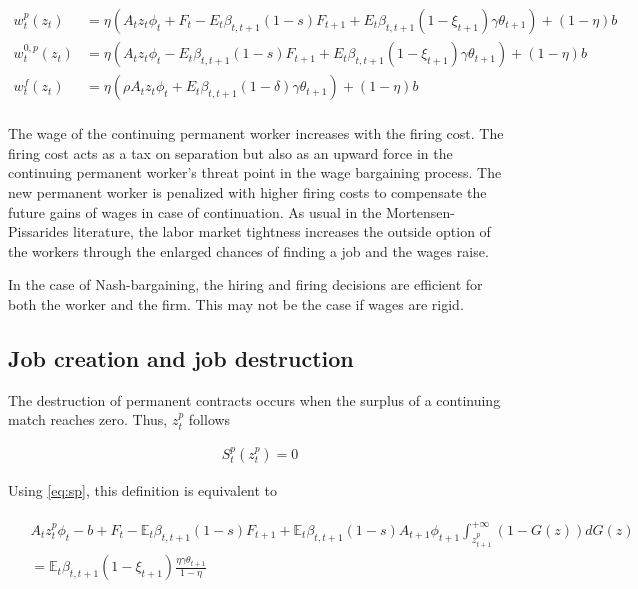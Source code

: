 \begin{align*}
w_t^p \left( z_t \right) &= \eta \left( A_t z_t \phi_t + F_t - E_t \beta_{t,t+1} (1-s) F_{t+1} + E_t \beta_{t,t+1} \left( 1-\xi_{t+1} \right) \gamma \theta_{t+1} \right) + (1-\eta) b\\
w_t^{0,p} \left( z_t \right) &= \eta \left( A_t z_t \phi_t - E_t \beta_{t,t+1} (1-s) F_{t+1} + E_t \beta_{t,t+1} \left( 1-\xi_{t+1} \right) \gamma \theta_{t+1} \right) + (1-\eta) b\\
w_t^f \left( z_t \right) &= \eta \left( \rho A_t z_t \phi_t + E_t \beta_{t,t+1} \left( 1-\delta \right) \gamma \theta_{t+1} \right) + (1-\eta) b\\
\end{align*}

The wage of the continuing permanent worker increases with the firing cost. The firing cost acts as a tax on separation but also as an upward force in the continuing permanent worker's threat point in the wage bargaining process. The new permanent worker is penalized with higher firing costs to compensate the future gains of wages in case of continuation. As usual in the Mortensen-Pissarides literature, the labor market tightness increases the outside option of the workers through the enlarged chances of finding a job and the wages raise.

In the case of Nash-bargaining, the hiring and firing decisions are efficient for both the worker and the firm. This may not be the case if wages are rigid.

\subsection{Job creation and job destruction}

The destruction of permanent contracts occurs when the surplus of a continuing match reaches zero. Thus, $z_t^p$ follows

\begin{align} \label{eq:def_zp}
S_t^p \left( z_t^p \right) = 0
\end{align}

Using \eqref{eq:sp}, this definition is equivalent to

\begin{align} \label{eq:zp}
\begin{split}
&A_t z_t^p \phi_t - b + F_t - \mathbb{E}_t \beta_{t,t+1} (1-s) F_{t+1} + \mathbb{E}_t  \beta_{t,t+1} (1-s) A_{t+1} \phi_{t+1} \int_{z_{t+1}^p}^{+\infty} \left( 1 -  G(z) \right) dG(z)\\
&= \mathbb{E}_t \beta_{t,t+1} \left( 1 - \xi_{t+1} \right) \frac{\eta \gamma \theta_{t+1}}{1-\eta}
\end{split}
\end{align}


